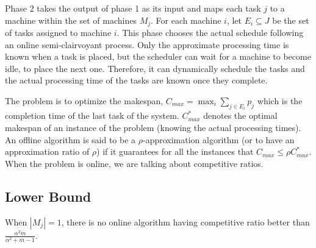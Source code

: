 \documentclass[twocolumn]{svjour3}
\begin{document}
Phase 2 takes the output of phase 1 as its input and maps each task $j$
to a machine within the set of machines $M_j$. For each machine $i$,
let $E_i \subseteq J$ be the set of tasks assigned to machine
$i$. This phase chooses the actual schedule following an online
semi-clairvoyant process. Only the approximate processing time is
known when a task is placed, but the scheduler can wait for a machine
to become idle, to place the next one. Therefore, it can dynamically
schedule the tasks and the actual processing time of the tasks are
known once they complete.

The problem is to optimize the makespan, $C_{max} = \max_i \sum_{j \in
  E_i} p_j$ which is the completion time of the last task of the
system. $C_{max}^{*}$ denotes the optimal makespan of an instance of
the problem (knowing the actual processing times). An offline algorithm is
said to be a $\rho$-approximation algorithm (or to have an
approximation ratio of $\rho$) if it guarantees for all the instances
that $C_{max} \leq \rho C_{max}^*$. When the problem is online, we are
talking about competitive ratios.


\subsection{Lower Bound}


\begin{theorem}
\label{th:model1-lb}
  When $|M_j| = 1$, there is no online algorithm having competitive
  ratio better than $\frac{\alpha^{2}m }{\alpha^{2} + m-1}$.
\end{theorem}
 
\end{document}
